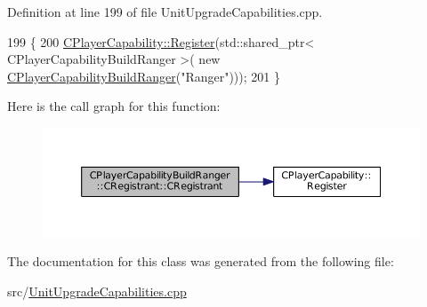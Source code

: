 Definition at line 199 of file Unit\+Upgrade\+Capabilities.\+cpp.


\begin{DoxyCode}
199                                                     \{
200     \hyperlink{classCPlayerCapability_a7e298018dcde2684451add3cfff065f7}{CPlayerCapability::Register}(std::shared\_ptr< CPlayerCapabilityBuildRanger >(\textcolor{keyword}{
      new} \hyperlink{classCPlayerCapabilityBuildRanger_adb3602c8f527157dcd0c9289272a9aa0}{CPlayerCapabilityBuildRanger}(\textcolor{stringliteral}{"Ranger"})));   
201 \}
\end{DoxyCode}
Here is the call graph for this function\+:
\nopagebreak
\begin{figure}[H]
\begin{center}
\leavevmode
\includegraphics[width=350pt]{classCPlayerCapabilityBuildRanger_1_1CRegistrant_a8fb4327aa5143d6818e2451fc6ff2e9c_cgraph}
\end{center}
\end{figure}


The documentation for this class was generated from the following file\+:\begin{DoxyCompactItemize}
\item 
src/\hyperlink{UnitUpgradeCapabilities_8cpp}{Unit\+Upgrade\+Capabilities.\+cpp}\end{DoxyCompactItemize}
